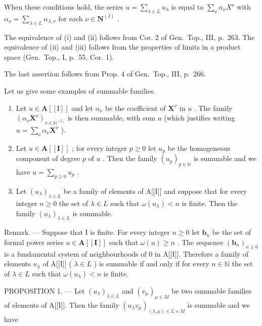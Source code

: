 When these conditions hold, the series \(u = \sum_{\lambda \in L} u_{\lambda}\) is equal to \(\sum_{\nu} \alpha_{\nu} X^{\nu}\) with \(\alpha_{\nu} = \sum_{\lambda \in L} \alpha_{\lambda, \nu}\) for each \(\nu \in \mathbf{N}^{(I)}\) .

The equivalence of (i) and (ii) follows from Cor. 2 of Gen.~Top., III, p.~263. The equivalence of (ii) and (iii) follows from the properties of limits in a product space (Gen.~Top., I, p.~55, Cor. 1).

The last assertion follows from Prop. 4 of Gen.~Top., III, p.~266.

Let us give some examples of summable families.

\begin{enumerate}
\def\labelenumi{\alph{enumi})}
\item
  Let \(u \in \mathbf{A}[[\mathrm{I}]]\) and let \(\alpha_{\nu}\) be the coefficient of \(\mathbf{X}^{\nu}\) in \(u\) . The family \((\alpha_{\nu}\mathbf{X}^{\nu})_{\nu \in \mathbb{N}^{(I)}}\) is then summable, with sum \(u\) (which justifies writing \(u = \sum_{\nu} \alpha_{\nu}\mathbf{X}^{\nu}\) ).
\item
  Let \(u \in \mathbf{A}[[\mathbf{I}]]\) ; for every integer \(p \geqslant 0\) let \(u_p\) be the homogeneous component of degree \(p\) of \(u\) . Then the family \((u_p)_{p \in \mathbb{N}}\) is summable and we have \(u = \sum_{p \geqslant 0} u_p\) .
\item
  Let \((u_{\lambda})_{\lambda \in L}\) be a family of elements of A{[}{[}I{]}{]} and suppose that for every integer \(n \geqslant 0\) the set of \(\lambda \in L\) such that \(\omega(u_{\lambda}) < n\) is finite. Then the family \((u_{\lambda})_{\lambda \in L}\) is summable.
\end{enumerate}

Remark. --- Suppose that I is finite. For every integer \(n \geqslant 0\) let \(\mathbf{b}_n\) be the set of formal power series \(u \in \mathbf{A}[[\mathbf{I}]]\) such that \(\omega(u) \geqslant n\) . The sequence \((\mathbf{b}_n)_{n \geqslant 0}\) is a fundamental system of neighbourhoods of 0 in A{[}{[}I{]}{]}. Therefore a family of elements \(u_{\lambda}\) of A{[}{[}I{]}{]} ( \(\lambda \in L\) ) is summable if and only if for every \(n \in \mathbb{N}\) the set of \(\lambda \in L\) such that \(\omega(u_{\lambda}) < n\) is finite.

PROPOSITION 1. --- Let \((u_{\lambda})_{\lambda \in L}\) and \((v_{\mu})_{\mu \in M}\) be two summable families of elements of A{[}{[}I{]}{]}. Then the family \((u_{\lambda}v_{\mu})_{(\lambda, \mu) \in L \times M}\) is summable and we have

